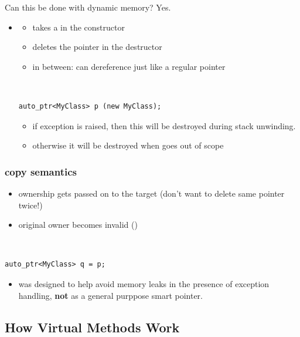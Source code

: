 \documentclass[english, 11pt]{article}
\begin{document}
\begin{exmp}
Can this be done with dynamic memory? Yes.
\begin{itemize}
  \item {}
  \begin{itemize}
    \item takes a  in the constructor
    \item deletes the pointer in the destructor
    \item in between: can dereference just like a regular pointer
  \end{itemize}
  \begin{exmp} \
\begin{lstlisting}
auto_ptr<MyClass> p (new MyClass);
\end{lstlisting}
\begin{itemize}
  \item if exception is raised, then this will be destroyed during stack unwinding.
  \item otherwise it will be destroyed when \tc{p} goes out of scope
\end{itemize}
  \end{exmp}
\end{itemize}

\end{exmp}

\subsubsection{ copy semantics}

\begin{itemize}
  \item ownership gets passed on to the target (don't want to delete same pointer twice!)
  \item original owner becomes invalid (\tc{NULL})
\end{itemize}

\begin{exmp}
  \
  \begin{lstlisting}
auto_ptr<MyClass> q = p;
  \end{lstlisting}
  \begin{itemize}
    \item {} was designed to help avoid memory leaks in the presence of exception handling, \textbf{not} as a general purppose smart pointer.
  \end{itemize}
\end{exmp}

\subsection{How Virtual Methods Work}
\end{document}
